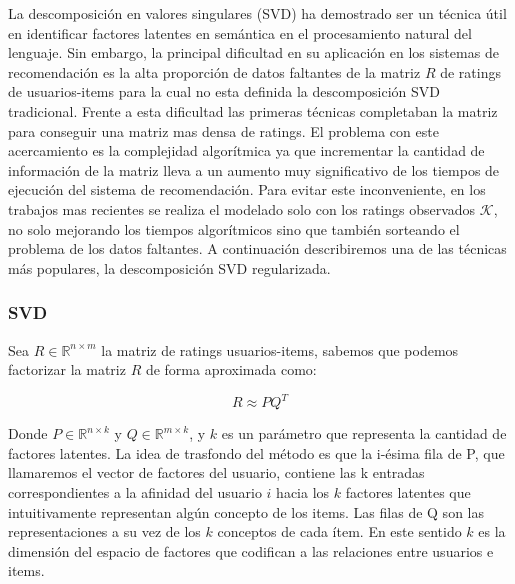 \documentclass[hidelinks,12pt,a4paper]{book}
\theoremstyle{plain}
\theoremstyle{definition}
\begin{document}
La descomposición en valores singulares (SVD) ha demostrado ser un técnica útil en identificar factores latentes en semántica en el procesamiento natural del lenguaje\cite{koren2010factor}. Sin embargo, la principal dificultad en su aplicación en los sistemas de recomendación es la alta proporción de datos faltantes de la matriz $R$ de ratings de usuarios-items para la cual no esta definida la descomposición SVD tradicional. Frente a esta dificultad las primeras técnicas completaban la matriz para conseguir una matriz mas densa de ratings. El problema con este acercamiento es la complejidad algorítmica ya que incrementar la cantidad de información de la matriz lleva a un aumento muy significativo de los tiempos de ejecución del sistema de recomendación. Para evitar este inconveniente, en los trabajos mas recientes se realiza el modelado solo con los ratings observados $\mathcal{K}$, no solo mejorando los tiempos algorítmicos sino que también sorteando el problema de los datos faltantes. A continuación describiremos una de las técnicas más populares, la descomposición SVD regularizada.


\subsubsection{SVD}

Sea $R\in \mathbb{R}^{n\times m}$ la matriz de ratings usuarios-items, sabemos que podemos factorizar la matriz $R$ de forma aproximada como\footnotemark:

\begin{equation}
R \approx PQ^T
\label{eq:SVD1}
\end{equation}

Donde $P\in \mathbb{R}^{n\times k}$ y $Q\in \mathbb{R}^{m\times k}$, y $k$ es un parámetro que representa la cantidad de factores latentes. La idea de trasfondo del método es que la i-ésima fila de P, que llamaremos el vector de factores del usuario, contiene las k entradas correspondientes a la afinidad del usuario $i$ hacia los $k$ factores latentes que intuitivamente representan algún concepto de los items. Las filas de Q son las representaciones a su vez de los $k$ conceptos de cada ítem. En este sentido $k$ es la dimensión del espacio de factores que codifican a las relaciones entre usuarios e items.
\end{document}
